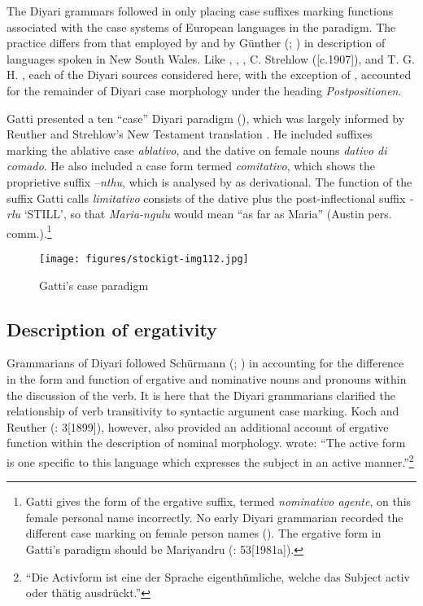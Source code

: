 The Diyari grammars followed \citet{teichelmann_outlines_1840} in only placing case suffixes marking functions associated with the case systems of European languages in the paradigm. The practice differs from that employed by \citet{threlkeld_australian_1834} and by Günther (\citeyear{gunther_native_1838}; \citeyear{gunther_lecture_1840}) in description of languages spoken in New South Wales. Like \citet{teichelmann_outlines_1840}, \citet{symmons_grammatical_1841}, \citet{kempe_grammar_1891}, C. Strehlow (\citeyear{strehlow_untitled_1931}[c.1907]), and T. G. H. \citet{strehlow_aranda_1938}, each of the Diyari sources considered here, with the exception of \citet[58, 64--65]{gatti_lingua_1930}, accounted for the remainder of Diyari case morphology {{under the heading} {\textit{Postpositionen}}}.

Gatti presented a ten “case” Diyari paradigm (), which was largely informed by Reuther and Strehlow’s New Testament translation \citeyearpar{reuther_testamenta_1897}. He included suffixes marking the ablative case \textit{ablativo}, and the dative on female nouns \citep[55]{austin_grammar_2013} \textit{dativo di comado}. He also included a case form termed \textit{comitativo}, which shows the proprietive suffix –\textit{nthu}, which is analysed by \citet[48]{austin_grammar_2013} as derivational. The function of the suffix Gatti calls \textit{limitativo} consists of the dative plus the post-inflectional suffix \textit{-rlu} `STILL', so that \textit{Maria-ngulu} would mean “as far as Maria” (Austin pers. comm.).\footnote{Gatti gives the form of the ergative suffix, termed \textit{nominativo agente}, on this female personal name incorrectly. No early Diyari grammarian recorded the different case marking on female person names (). The ergative form in Gatti’s paradigm should be Mariyandru (\citealt{austin_grammar_2013}: 53[1981a]).}


\begin{figure}
\texttt{[image: figures/stockigt-img112.jpg]}
\caption{Gatti’s case paradigm \citeyearpar[58]{gatti_lingua_1930}}
\label{bkm:Ref449376202}\label{fig:key:163}
\end{figure}

\subsection{Description of ergativity}
\label{sec:key:8.5.2}\label{bkm:Ref456873578}
Grammarians of Diyari followed Schürmann (\citeyear{schurmann_vocabulary_1844}; ) in accounting for the difference in the form and function of ergative and nominative nouns and pronouns within the discussion of the verb. It is here that the Diyari grammarians clarified the relationship of verb transitivity to syntactic argument case marking. Koch and Reuther (\citeyear{reuther_three_1981}: 3[1899]), however, also provided an additional account of ergative function within the description of nominal morphology. \citet[no pag.]{koch_untitled_1868} wrote: “The active form is one specific to this language which expresses the subject in an active manner.''\footnote{``Die Activform ist eine der Sprache eigenthümliche, welche das Subject activ oder thätig ausdrückt.''}

